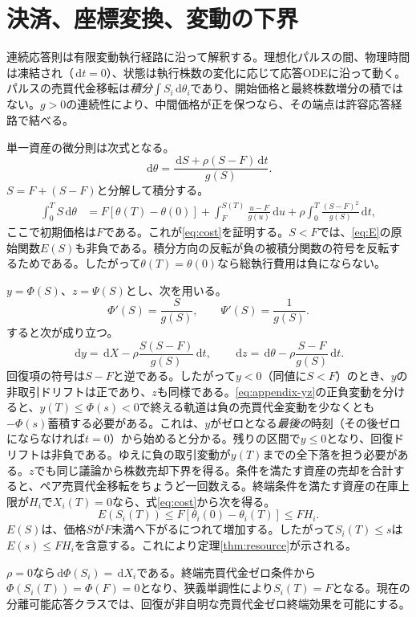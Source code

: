 \documentclass[11pt]{article}
\numberwithin{equation}{section}
\theoremstyle{definition}
\theoremstyle{remark}
\newcommand{\dd}{\,\mathrm{d}}
\begin{document}
\appendix
\section{決済、座標変換、変動の下界}\label{app:accounting}
連続応答則は有限変動執行経路に沿って解釈する。理想化パルスの間、物理時間は凍結され（$\dd t=0$）、状態は執行株数の変化に応じて応答ODEに沿って動く。パルスの売買代金移転は\emph{積分}$\int S_i\dd\theta_i$であり、開始価格と最終株数増分の積ではない。$g>0$の連続性により、中間価格が正を保つなら、その端点は許容応答経路で結べる。

単一資産の微分則は次式となる。
\begin{equation}\label{eq:appendix-s}
\dd\theta=\frac{\dd S+\rho(S-F)\dd t}{g(S)}.
\end{equation}
$S=F+(S-F)$と分解して積分する。
\begin{align*}
\int_0^T S\dd\theta
&=F[\theta(T)-\theta(0)]
+\int_F^{S(T)}\frac{u-F}{g(u)}\dd u
+\rho\int_0^T\frac{(S-F)^2}{g(S)}\dd t,
\end{align*}
ここで初期価格は$F$である。これが\eqref{eq:cost}を証明する。$S<F$では、\eqref{eq:E}の原始関数$E(S)$も非負である。積分方向の反転が負の被積分関数の符号を反転するためである。したがって$\theta(T)=\theta(0)$なら総執行費用は負にならない。

$y=\Phi(S)$、$z=\Psi(S)$とし、次を用いる。
\[
\Phi'(S)=\frac{S}{g(S)},\qquad \Psi'(S)=\frac1{g(S)}.
\]
すると次が成り立つ。
\begin{equation}\label{eq:appendix-yz}
\dd y=\dd X-\rho\frac{S(S-F)}{g(S)}\dd t,
\qquad
\dd z=\dd\theta-\rho\frac{S-F}{g(S)}\dd t.
\end{equation}
回復項の符号は$S-F$と逆である。したがって$y<0$（同値に$S<F$）のとき、$y$の非取引ドリフトは正であり、$z$も同様である。\eqref{eq:appendix-yz}の正負変動を分けると、$y(T)\le\Phi(s)<0$で終える軌道は負の売買代金変動を少なくとも$-\Phi(s)$蓄積する必要がある。これは、$y$がゼロとなる\emph{最後の}時刻（その後ゼロにならなければ$t=0$）から始めると分かる。残りの区間で$y\le0$となり、回復ドリフトは非負である。ゆえに負の取引変動が$y(T)$までの全下落を担う必要がある。$z$でも同じ議論から株数売却下界を得る。条件を満たす資産の売却を合計すると、ペア売買代金移転をちょうど一回数える。終端条件を満たす資産の在庫上限が$H_i$で$X_i(T)=0$なら、式\eqref{eq:cost}から次を得る。
\[
E(S_i(T))\le F\left[\theta_i(0)-\theta_i(T)\right]\le FH_i.
\]
$E(S)$は、価格$S$が$F$未満へ下がるにつれて増加する。したがって$S_i(T)\le s$は$E(s)\le FH_i$を含意する。これにより定理\ref{thm:resource}が示される。

$\rho=0$なら$\dd\Phi(S_i)=\dd X_i$である。終端売買代金ゼロ条件から$\Phi(S_i(T))=\Phi(F)=0$となり、狭義単調性により$S_i(T)=F$となる。現在の分離可能応答クラスでは、回復が非自明な売買代金ゼロ終端効果を可能にする。
\end{document}

